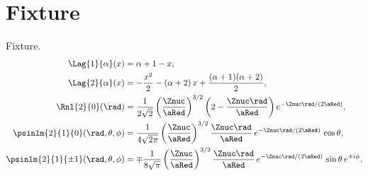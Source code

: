 \chapter{Fixture}\label{c11}

Fixture.
\begin{align}
  \Lag{1}{\alpha}(x) &= \alpha + 1 - x,
    \label{c11.eq.lag1} \\
  \Lag{2}{\alpha}(x) &= -\frac{x^2}{2} - (\alpha + 2)\,x + \frac{(\alpha + 1)(\alpha + 2)}{2},
    \label{c11.eq.lag2} \\
  \Rnl{2}{0}(\rad) &= \frac{1}{2\sqrt{2}}\left(\frac{\Znuc}{\aRed}\right)^{3/2}\left(2 - \frac{\Znuc\rad}{\aRed}\right) e^{-\Znuc\rad/(2\aRed)},
    \label{c11.eq.r20} \\
  \psinlm{2}{1}{0}(\rad, \theta, \phi) &= \frac{1}{4\sqrt{2\pi}}\left(\frac{\Znuc}{\aRed}\right)^{3/2}\frac{\Znuc\rad}{\aRed}\,e^{-\Znuc\rad/(2\aRed)}\,\cos\theta,
    \label{c11.eq.psi210} \\
  \psinlm{2}{1}{\pm 1}(\rad, \theta, \phi) &= \mp\frac{1}{8\sqrt{\pi}}\left(\frac{\Znuc}{\aRed}\right)^{3/2}\frac{\Znuc\rad}{\aRed}\,e^{-\Znuc\rad/(2\aRed)}\,\sin\theta\,e^{\pm i\phi}.
    \label{c11.eq.psi21pm}
\end{align}
